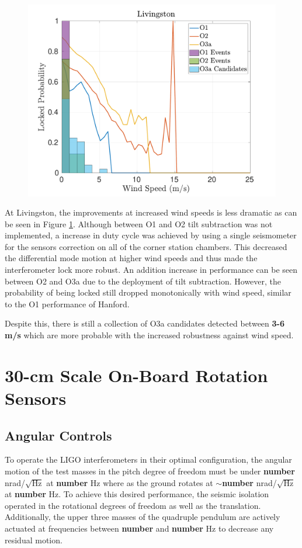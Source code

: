 \documentclass [12pt, proquest]{uwthesis}[2019]
\begin{document}
\begin{figure}%
\begin{center}
\includegraphics[width=\textwidth]{LLO_WindVsLockEvents.pdf}
\caption{}
\label{LLO_events}
\end{center}
\end{figure}

At Livingston, the improvements at increased wind speeds is less dramatic as can be seen in Figure \ref{LLO_events}. Although between O1 and O2 tilt subtraction was not implemented, a increase in duty cycle was achieved by using a single seismometer for the sensors correction on all of the corner station chambers. This decreased the differential mode motion at higher wind speeds and thus made the interferometer lock more robust. An addition increase in performance can be seen between O2 and O3a due to the deployment of tilt subtraction. However, the probability of being locked still dropped monotonically with wind speed, similar to the O1 performance of Hanford.

Despite this, there is still a collection of O3a candidates detected between \textbf{3-6 m/s} which are more probable with the increased robustness against wind speed.

\chapter{30-cm Scale On-Board Rotation Sensors}
\section{Angular Controls}
To operate the LIGO interferometers in their optimal configuration, the angular motion of the test masses in the pitch degree of freedom must be under \textbf{number} nrad/$\sqrt{\text{Hz}}$ at \textbf{number} Hz where as the ground rotates at $\sim$\textbf{number} nrad/$\sqrt{\text{Hz}}$ at \textbf{number} Hz. To achieve this desired performance, the seismic isolation operated in the rotational degrees of freedom as well as the translation. Additionally, the upper three masses of the quadruple pendulum are actively actuated at frequencies between \textbf{number} and \textbf{number} Hz to decrease any residual motion.
\end{document}
